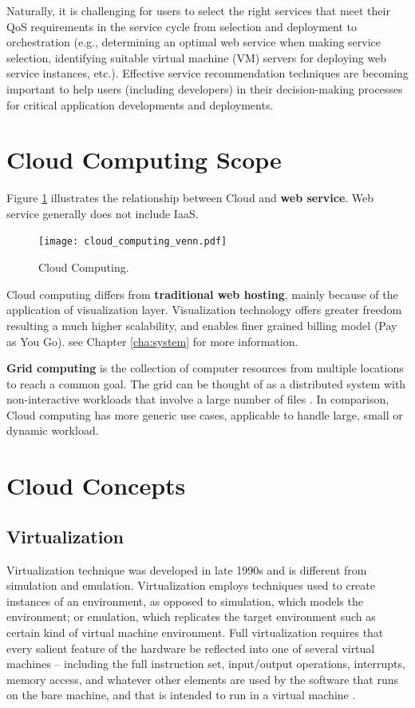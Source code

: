 Naturally, it is challenging for users to
select the right services that meet their QoS requirements in the
service cycle from selection and deployment to orchestration
(e.g., determining an optimal web service when making service
selection, identifying suitable virtual machine (VM) servers for
deploying web service instances, etc.). Effective service
recommendation techniques are becoming important to help
users (including developers) in their decision-making processes
for critical application developments and deployments. 

\section{Cloud Computing Scope}

Figure \ref{fig:cloud_computing} illustrates the relationship between Cloud
and \textbf{web service}. Web service generally does not include IaaS.

\begin{figure}[ht]
  \texttt{[image: cloud\_computing\_venn.pdf]}
  \caption{Cloud Computing.}
  \label{fig:cloud_computing}
\end{figure}

Cloud computing differs from \textbf{traditional web hosting},
mainly because of the application of visualization layer.
Visualization technology offers greater freedom resulting a
much higher scalability, and enables finer grained billing model (Pay as You Go).
see Chapter \ref{cha:system} for more information.

\textbf{Grid computing} is the collection of computer resources from multiple locations to reach a common goal. The grid can be thought of as a distributed system with non-interactive workloads that involve a large number of files \cite{grid_computing}.
In comparison, Cloud computing has more generic use cases, applicable to handle large, small or dynamic workload.

\section{Cloud Concepts}

\subsection{Virtualization}
Virtualization technique was developed in late 1990s and is different from simulation and emulation.
Virtualization employs techniques used to create instances of an environment, as opposed to simulation, which models the environment; or emulation, which replicates the target environment such as certain kind of virtual machine environment. Full virtualization requires that every salient feature of the hardware be reflected into one of several virtual machines – including the full instruction set, input/output operations, interrupts, memory access, and whatever other elements are used by the software that runs on the bare machine, and that is intended to run in a virtual machine \cite{virtualization}.

